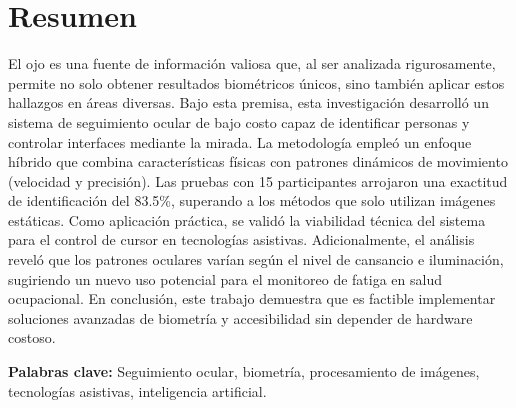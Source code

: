 \chapter*{Resumen}

El ojo es una fuente de información valiosa que, al ser analizada rigurosamente, permite no solo obtener resultados biométricos únicos, sino también aplicar estos hallazgos en áreas diversas. Bajo esta premisa, esta investigación desarrolló un sistema de seguimiento ocular de bajo costo capaz de identificar personas y controlar interfaces mediante la mirada. La metodología empleó un enfoque híbrido que combina características físicas con patrones dinámicos de movimiento (velocidad y precisión). Las pruebas con 15 participantes arrojaron una exactitud de identificación del 83.5\%, superando a los métodos que solo utilizan imágenes estáticas. Como aplicación práctica, se validó la viabilidad técnica del sistema para el control de cursor en tecnologías asistivas. Adicionalmente, el análisis reveló que los patrones oculares varían según el nivel de cansancio e iluminación, sugiriendo un nuevo uso potencial para el monitoreo de fatiga en salud ocupacional. En conclusión, este trabajo demuestra que es factible implementar soluciones avanzadas de biometría y accesibilidad sin depender de hardware costoso.

\vspace{0.5cm}

\textbf{Palabras clave:} Seguimiento ocular, biometría, procesamiento de imágenes, tecnologías asistivas, inteligencia artificial.